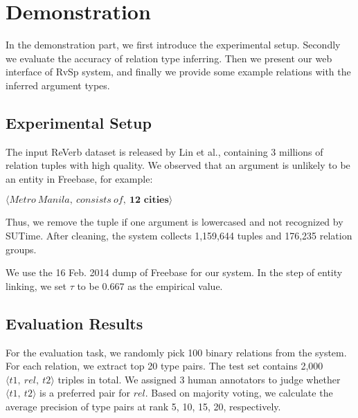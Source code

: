 \section{Demonstration}



In the demonstration part, we first introduce the experimental setup.
Secondly we evaluate the accuracy of relation type inferring.
Then we present our web interface of RvSp system, and finally
we provide some example relations with the inferred argument types.

\subsection{Experimental Setup}
The input ReVerb dataset is released by Lin et al., containing 3 millions of relation tuples with high quality.
We observed that an argument is unlikely to be an entity in Freebase, for example:

$\langle Metro\ Manila,\ consists\ of,\ \textbf{12 cities}\rangle$

\noindent
Thus, we remove the tuple if one argument is lowercased and not recognized by SUTime.
After cleaning, the system collects 1,159,644 tuples and 176,235 relation groups.

We use the 16 Feb. 2014 dump of Freebase for our system. In the step of entity linking, we set $\tau$ to be 0.667
as the empirical value.

\subsection{Evaluation Results}
For the evaluation task, we randomly pick 100 binary relations from the system.
For each relation, we extract top 20 type pairs.
The test set contains 2,000 $\langle t1,\ rel,\ t2 \rangle$ triples in total.
We assigned 3 human annotators to judge whether $\langle t1,\ t2 \rangle$ is a preferred pair for $rel$.
Based on majority voting, we calculate the average precision of type pairs at rank 5, 10, 15, 20, respectively.

